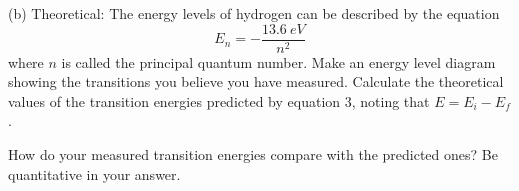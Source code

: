 \newpage

(b)  Theoretical:  The energy levels of hydrogen can be described by the equation
\begin{equation}
E_n = -\frac{13.6~eV}{n^2}
\end{equation}
where $n$ is called the principal quantum number.  Make an energy level diagram showing the transitions you believe you have measured. Calculate the theoretical values of the transition energies predicted by equation 3, noting that $E = E_i - E_f$.

\answerspace{5.0in}

How do your measured transition energies compare with the predicted ones? Be quantitative in your answer.
\answerspace{1.0in}
